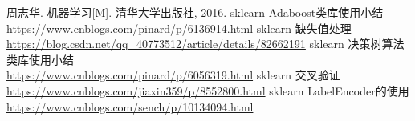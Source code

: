 \documentclass{article}
\begin{document}
\begin{thebibliography}{1}
	 周志华. 机器学习[M]. 清华大学出版社, 2016.
	 sklearn Adaboost类库使用小结\\\url{https://www.cnblogs.com/pinard/p/6136914.html}
	 sklearn 缺失值处理\\\url{https://blog.csdn.net/qq_40773512/article/details/82662191}
	 sklearn 决策树算法类库使用小结\\\url{https://www.cnblogs.com/pinard/p/6056319.html}
	 sklearn 交叉验证\\\url{https://www.cnblogs.com/jiaxin359/p/8552800.html}
	 sklearn LabelEncoder的使用\\\url{https://www.cnblogs.com/sench/p/10134094.html}
\end{thebibliography}
		
\end{document}
